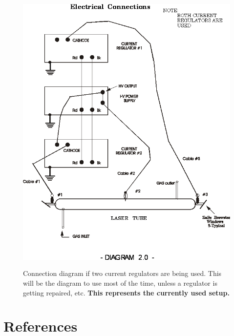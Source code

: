 \documentclass{../lab}
\begin{document}
\begin{figure}[H]
\centering
    \href{http://experimentationlab.berkeley.edu/sites/default/files/images/CO210.gif}{\includegraphics[width=0.4\linewidth]{images/CO210.png}} \\
    \caption{Connection diagram if two current regulators are being used. This will be the diagram to use most of the time, unless a regulator is getting repaired, etc. \textbf{This represents the currently used setup.}}
\end{figure}

\section{References}
\label{sec:References}
\end{document}

